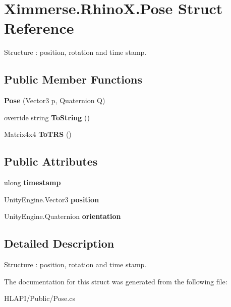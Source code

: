 \hypertarget{struct_ximmerse_1_1_rhino_x_1_1_pose}{}\section{Ximmerse.\+Rhino\+X.\+Pose Struct Reference}
\label{struct_ximmerse_1_1_rhino_x_1_1_pose}


Structure \+: position, rotation and time stamp.  


\subsection*{Public Member Functions}
\begin{DoxyCompactItemize}
\item 
\mbox{\label{struct_ximmerse_1_1_rhino_x_1_1_pose_ad4410498d9dc1bb199825c3d7c1e6dec}} 
{\bfseries Pose} (Vector3 p, Quaternion Q)
\item 
\mbox{\label{struct_ximmerse_1_1_rhino_x_1_1_pose_ac17c62b044b130e771bde4aa80858dd9}} 
override string {\bfseries To\+String} ()
\item 
\mbox{\label{struct_ximmerse_1_1_rhino_x_1_1_pose_a4ad7225d77ceab169e28a4f89cd0abab}} 
Matrix4x4 {\bfseries To\+T\+RS} ()
\end{DoxyCompactItemize}
\subsection*{Public Attributes}
\begin{DoxyCompactItemize}
\item 
\mbox{\label{struct_ximmerse_1_1_rhino_x_1_1_pose_a74423dd5b285bcc1aed9f46e1cfd9ce4}} 
ulong {\bfseries timestamp}
\item 
\mbox{\label{struct_ximmerse_1_1_rhino_x_1_1_pose_a6b7f64762a834a1c15c8756da809360d}} 
Unity\+Engine.\+Vector3 {\bfseries position}
\item 
\mbox{\label{struct_ximmerse_1_1_rhino_x_1_1_pose_a8c23fa1f5d40da1532633cba2be209d3}} 
Unity\+Engine.\+Quaternion {\bfseries orientation}
\end{DoxyCompactItemize}


\subsection{Detailed Description}
Structure \+: position, rotation and time stamp. 



The documentation for this struct was generated from the following file\+:\begin{DoxyCompactItemize}
\item 
H\+L\+A\+P\+I/\+Public/Pose.\+cs\end{DoxyCompactItemize}
